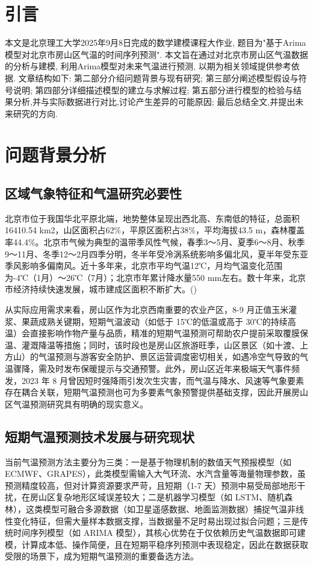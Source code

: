 \documentclass[withoutpreface,bwprint]{cumcmthesis} %
\begin{document}
\section{引言}
本文是北京理工大学2025年9月8日完成的数学建模课程大作业, 题目为"基于Arima模型对北京市房山区气温的时间序列预测". 本文旨在通过对北京市房山区气温数据的分析与建模, 利用Arima模型对未来气温进行预测, 以期为相关领域提供参考依据. 文章结构如下: 第二部分介绍问题背景与现有研究; 第三部分阐述模型假设与符号说明; 第四部分详细描述模型的建立与求解过程; 第五部分进行模型的检验与结果分析,并与实际数据进行对比,讨论产生差异的可能原因; 最后总结全文,并提出未来研究的方向.
\section{问题背景分析}
\subsection{区域气象特征和气温研究必要性}
北京市位于我国华北平原北端，地势整体呈现出西北高、东南低的特征，总面积16410.54 km2，山区面积占62\%，平原区面积占38\%，平均海拔43.5 m，森林覆盖率44.4\%。北京市气候为典型的温带季风性气候，春季3～5月、夏季6～8月、秋季9～11月、冬季12～2月四季分明，冬半年受冷涡系统影响多偏北风，夏半年受东亚季风影响多偏南风。近十多年来，北京市平均气温12℃，月均气温变化范围为-4℃（1月）～26℃（7月）；北京市年累计降水量550 mm左右。数十年来，北京市经济持续快速发展，城市建成区面积不断扩大。(\cite{cheng2025beijing})

从实际应用需求来看，房山区作为北京西南重要的农业产区，8-9 月正值玉米灌浆、果蔬成熟关键期，短期气温波动（如低于 15℃的低温或高于 30℃的持续高温）会直接影响作物产量与品质，精准的短期气温预测可帮助农户提前采取覆膜保温、灌溉降温等措施；同时，该时段也是房山区旅游旺季，山区景区（如十渡、上方山）的气温预测与游客安全防护、景区运营调度密切相关，如遇冷空气导致的气温骤降，需及时发布保暖提示与交通预警。此外，房山区近年来极端天气事件频发，2023 年 8 月曾因短时强降雨引发次生灾害，而气温与降水、风速等气象要素存在耦合关联，短期气温预测也可为多要素气象预警提供基础支撑，因此开展房山区气温预测研究具有明确的现实意义。
\subsection{短期气温预测技术发展与研究现状}
当前气温预测方法主要分为三类：一是基于物理机制的数值天气预报模型（如 ECMWF、GRAPES），此类模型需输入大气环流、水汽含量等海量物理参数，虽预测精度较高，但对计算资源要求严苛，且短期（1-7 天）预测中易受局部地形干扰，在房山区复杂地形区域误差较大；二是机器学习模型（如 LSTM、随机森林），这类模型可融合多源数据（如卫星遥感数据、地面监测数据）捕捉气温非线性变化特征，但需大量样本数据支撑，当数据量不足时易出现过拟合问题；三是传统时间序列模型（如 ARIMA 模型），其核心优势在于仅依赖历史气温数据即可建模，计算成本低、操作简便，且在短期平稳序列预测中表现稳定，因此在数据获取受限的场景下，成为短期气温预测的重要备选方法。​
\end{document}
